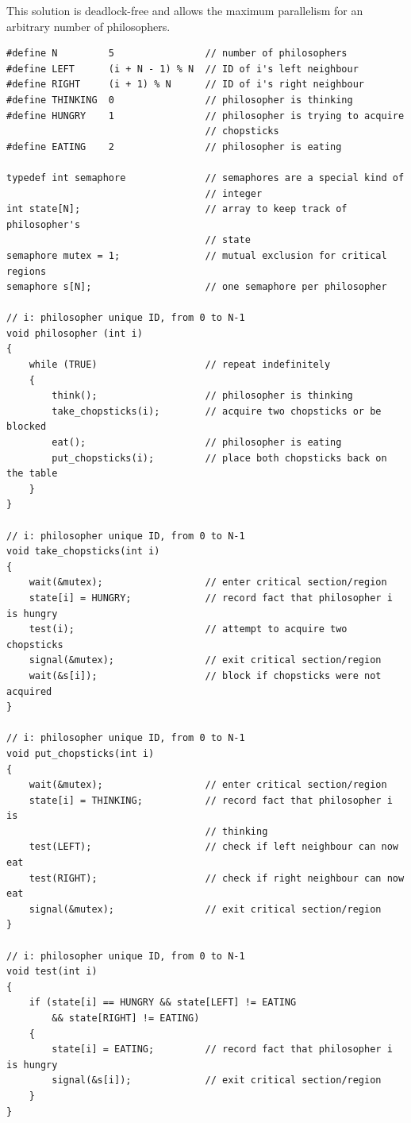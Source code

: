 \documentclass[a4paper]{systems-software}
\begin{document}
This solution is deadlock-free and allows the maximum parallelism for an arbitrary number of philosophers.

\begin{lstlisting}[title={Producer class}]
#define N         5                // number of philosophers
#define LEFT      (i + N - 1) % N  // ID of i's left neighbour
#define RIGHT     (i + 1) % N      // ID of i's right neighbour
#define THINKING  0                // philosopher is thinking
#define HUNGRY    1                // philosopher is trying to acquire
                                   // chopsticks
#define EATING    2                // philosopher is eating

typedef int semaphore              // semaphores are a special kind of
                                   // integer
int state[N];                      // array to keep track of philosopher's
                                   // state             
semaphore mutex = 1;               // mutual exclusion for critical regions
semaphore s[N];                    // one semaphore per philosopher

// i: philosopher unique ID, from 0 to N-1
void philosopher (int i)
{
	while (TRUE)                   // repeat indefinitely
	{
		think();                   // philosopher is thinking
		take_chopsticks(i);        // acquire two chopsticks or be blocked
		eat();                     // philosopher is eating
		put_chopsticks(i);         // place both chopsticks back on the table
	}
}

// i: philosopher unique ID, from 0 to N-1
void take_chopsticks(int i)
{
	wait(&mutex);                  // enter critical section/region
	state[i] = HUNGRY;             // record fact that philosopher i is hungry
	test(i);                       // attempt to acquire two chopsticks
	signal(&mutex);                // exit critical section/region
	wait(&s[i]);                   // block if chopsticks were not acquired
}

// i: philosopher unique ID, from 0 to N-1
void put_chopsticks(int i)
{
	wait(&mutex);                  // enter critical section/region
	state[i] = THINKING;           // record fact that philosopher i is
	                               // thinking
	test(LEFT);                    // check if left neighbour can now eat
	test(RIGHT);                   // check if right neighbour can now eat
	signal(&mutex);                // exit critical section/region
}

// i: philosopher unique ID, from 0 to N-1
void test(int i)
{
	if (state[i] == HUNGRY && state[LEFT] != EATING
		&& state[RIGHT] != EATING)
	{
		state[i] = EATING;         // record fact that philosopher i is hungry
		signal(&s[i]);             // exit critical section/region
	}
}
\end{lstlisting}
\end{document}
